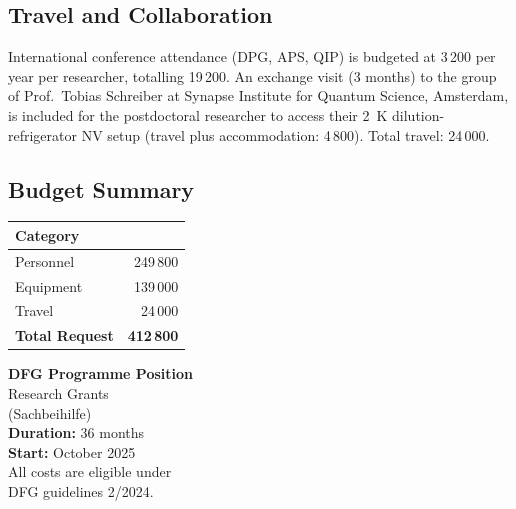 \subsection{Travel and Collaboration}

International conference attendance (DPG, APS, QIP) is budgeted at \EUR{}3\,200 per
year per researcher, totalling \EUR{}19\,200. An exchange visit (3 months) to the group
of Prof.\ Tobias Schreiber at Synapse Institute for Quantum Science, Amsterdam, is
included for the postdoctoral researcher to access their 2~K dilution-refrigerator
NV setup (travel plus accommodation: \EUR{}4\,800). Total travel: \EUR{}24\,000.

\subsection{Budget Summary}

\vspace{4pt}
\noindent
\begin{minipage}[t]{0.54\linewidth}
\begin{tcolorbox}[
  enhanced, sharp corners,
  colback=dfglightgray, colframe=dfgblue,
  top=3mm, bottom=3mm, left=4mm, right=4mm
]
\begin{tabularx}{\linewidth}{Xr}
\rowcolor{dfgblue!12}
\textbf{Category} & \textbf{\EUR{}}\\
\midrule
Personnel & 249\,800 \\
Equipment & 139\,000 \\
Travel & 24\,000 \\
\midrule
\rowcolor{dfgblue!20}
\textbf{Total Request} & \textbf{412\,800} \\
\end{tabularx}
\end{tcolorbox}
\end{minipage}%
\hfill
\begin{minipage}[t]{0.42\linewidth}
\begin{tcolorbox}[
  enhanced, sharp corners,
  colback=white, colframe=dfgaccent,
  top=3mm, bottom=3mm, left=4mm, right=4mm
]
{\small\color{dfgdarkgray}
\textbf{\color{dfgblue}DFG Programme Position}\\[4pt]
Research Grants\\
(Sachbeihilfe)\\[4pt]
\textbf{Duration:} 36 months\\
\textbf{Start:} October 2025\\[4pt]
All costs are eligible under\\
DFG guidelines 2/2024.}
\end{tcolorbox}
\end{minipage}

